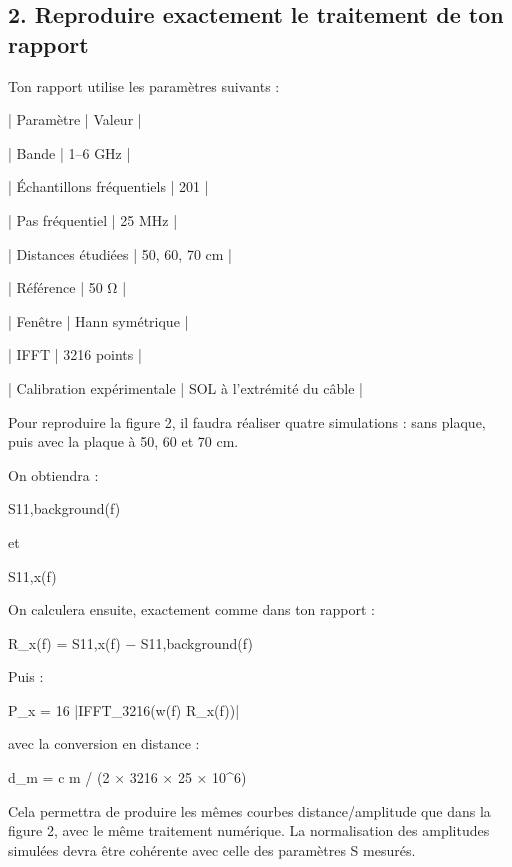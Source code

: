 \documentclass[11pt,a4paper]{article}
\begin{document}
\subsection*{2. Reproduire exactement le traitement de ton rapport}
\par\medskip
Ton rapport utilise les paramètres suivants :\par
\par\medskip
| Paramètre | Valeur |\par
| Bande | 1–6 GHz |\par
| Échantillons fréquentiels | 201 |\par
| Pas fréquentiel | 25 MHz |\par
| Distances étudiées | 50, 60, 70 cm |\par
| Référence | 50 Ω |\par
| Fenêtre | Hann symétrique |\par
| IFFT | 3216 points |\par
| Calibration expérimentale | SOL à l'extrémité du câble |\par
\par\medskip
Pour reproduire la figure 2, il faudra réaliser quatre simulations : sans plaque, puis avec la plaque à 50, 60 et 70 cm.\par
\par\medskip
On obtiendra :\par
\par\medskip
S11,background(f)\par
\par\medskip
et\par
\par\medskip
S11,x(f)\par
\par\medskip
On calculera ensuite, exactement comme dans ton rapport :\par
\par\medskip
R\_x(f) = S11,x(f) − S11,background(f)\par
\par\medskip
Puis :\par
\par\medskip
P\_x = 16 |IFFT\_3216(w(f) R\_x(f))|\par
\par\medskip
avec la conversion en distance :\par
\par\medskip
d\_m = c m / (2 × 3216 × 25 × 10\textasciicircum{}6)\par
\par\medskip
Cela permettra de produire les mêmes courbes distance/amplitude que dans la figure 2, avec le même traitement numérique. La normalisation des amplitudes simulées devra être cohérente avec celle des paramètres S mesurés.\par
\par\medskip
\end{document}
